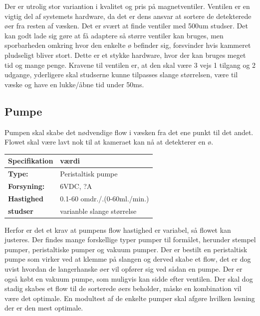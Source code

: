 Der er utrolig stor variantion i kvalitet og pris på magnetventiler. Ventilen er en vigtig del af systemets hardware, da det er dens ansvar at sortere de detekterede øer fra resten af væsken. Det er svært at finde ventiler med 500um studser. Det kan godt lade sig gøre at få adaptere så større ventiler kan bruges, men sporbarheden omkring hvor den enkelte ø befinder sig, forsvinder hvis kammeret pludseligt bliver stort. Dette er et stykke hardware, hvor der kan bruges meget tid og mange penge.
Kravene til ventilen er, at den skal være 3 vejs 1 tilgang og 2 udgange, yderligere skal studserne kunne tilpasses slange størrelsen, være til væske og have en lukke/åbne tid under 50ms.

\subsection{Pumpe}
Pumpen skal skabe det nødvendige flow i væsken fra det ene punkt til det andet. Flowet skal være lavt nok til at kameraet kan nå at detekterer en ø.

\begin{center}
		\begin{longtable}{ | m{6.5cm} | m{6.5cm}| } 
			\hline
			\textbf{Specifikation} &\textbf{værdi} \\ 
			\hline
			\textbf{Type:} & Peristaltisk pumpe \\ 
			\hline
			\textbf{Forsyning:} & 6VDC, ?A  \\ 
			\hline
			\textbf{Hastighed} & 0.1-60 omdr./.(0-60ml./min.) \\ 
			\hline		
			\textbf{studser} & varianble slange størrelse  \\ 
			\hline	
		\end{longtable}
\end{center}



 Herfor er det et krav at pumpens flow hastighed er variabel, så flowet kan justeres. Der findes mange forskellige typer pumper til formålet, herunder stempel pumper, peristaltiske pumper og vakuum pumper. Der er bestilt en peristaltisk pumpe som virker ved at klemme på slangen og derved skabe et flow, det er dog uvist hvordan de langerhanske øer vil opfører sig ved sådan en pumpe. Der er også købt en vakuum pumpe, som muligvis kan sidde efter ventilen. Der skal dog stadig skabes et flow til de sorterede øers beholder, måske en kombination vil være det optimale. En modultest af de enkelte pumper skal afgøre hvilken løsning der er den mest optimale. 

